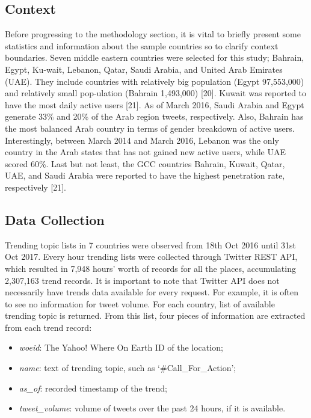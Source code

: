 \documentclass{llncs}
\begin{document}
\subsection{Context}

Before progressing to the methodology section, it is vital to briefly
present some statistics and information about the sample countries so
to clarify context boundaries.  Seven middle eastern countries were
selected for this study; Bahrain, Egypt, Ku-wait, Lebanon, Qatar,
Saudi Arabia, and United Arab Emirates (UAE). They include countries
with relatively big population (Egypt 97,553,000) and relatively small
pop-ulation (Bahrain 1,493,000) [20]. Kuwait was reported to have the
most daily active users [21]. As of March 2016, Saudi Arabia and Egypt
generate 33\% and 20\% of the Arab region tweets, respectively. Also,
Bahrain has the most balanced Arab country in terms of gender
breakdown of active users. Interestingly, between March 2014 and March
2016, Lebanon was the only country in the Arab states that has not
gained new active users, while UAE scored 60\%. Last but not least,
the GCC countries Bahrain, Kuwait, Qatar, UAE, and Saudi Arabia were
reported to have the highest penetration rate, respectively [21].

\subsection{Data Collection}

Trending topic lists in 7 countries were observed from 18th Oct 2016
until 31st Oct 2017. Every hour trending lists were collected through
Twitter REST API, which resulted in 7,948 hours' worth of records for
all the places, accumulating 2,307,163 trend records. It is important
to note that Twitter API does not necessarily have trends data
available for every request. For example, it is often to see no
information for tweet volume. For each country, list of available
trending topic is returned. From this list, four pieces of information
are extracted from each trend record:

\begin{itemize}
\item {\emph{woeid}}: The Yahoo! Where On Earth ID of the location;
\item {\emph{name}}: text of trending topic, such as `\#Call\_For\_Action';
\item {\emph{as\_of}}: recorded timestamp of the trend;
\item {\emph{tweet\_volume}}: volume of tweets over the past 24 hours, if it is available.
\end{itemize}
\end{document}
